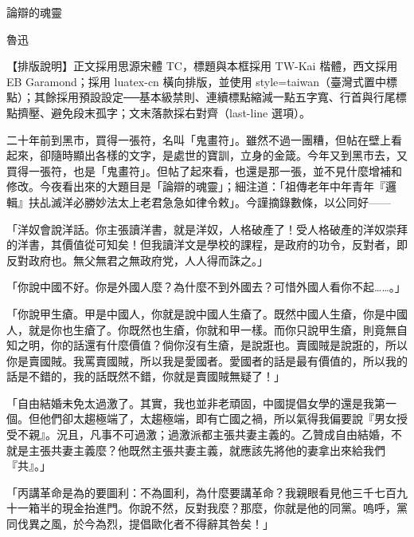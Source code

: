\documentclass[12pt]{article}
\newcommand\en[1]{{\garamond #1}}
\begin{document}
{\centering\kaiti{} 論辯的魂靈\par}
\vspace{0.3em}
{\centering\kaiti{} 魯迅\par}
\vspace{1.2em}

\noindent\setlength{\fboxsep}{0.8em}%
\colorbox{yellow!14!orange!6}{\parbox{\dimexpr\linewidth-2\fboxsep\relax}{%
  \kaiti\small\setlength{\parindent}{0pt}\color{black!75}%
  【排版說明】正文採用思源宋體 \en{TC}，標題與本框採用 \en{TW-Kai} 楷體，西文採用 \en{EB Garamond}；採用 \en{luatex-cn} 橫向排版，並使用 \en{style=taiwan}（臺灣式置中標點）；其餘採用預設設定──基本級禁則、連續標點縮減一點五字寬、行首與行尾標點擠壓、避免段末孤字；文末落款採右對齊（\en{last-line} 選項）。}}
\vspace{0.8em}

二十年前到黑市，買得一張符，名叫「鬼畫符」。雖然不過一團糟，但帖在壁上看起來，卻隨時顯出各樣的文字，是處世的寶訓，立身的金箴。今年又到黑市去，又買得一張符，也是「鬼畫符」。但帖了起來看，也還是那一張，並不見什麼增補和修改。今夜看出來的大題目是「論辯的魂靈」；細注道：「祖傳老年中年青年『邏輯』扶乩滅洋必勝妙法太上老君急急如律令敕」。今謹摘錄數條，以公同好——

「洋奴會說洋話。你主張讀洋書，就是洋奴，人格破產了！受人格破產的洋奴崇拜的洋書，其價值從可知矣！但我讀洋文是學校的課程，是政府的功令，反對者，即反對政府也。無父無君之無政府党，人人得而誅之。」

「你說中國不好。你是外國人麼？為什麼不到外國去？可惜外國人看你不起……。」

「你說甲生瘡。甲是中國人，你就是說中國人生瘡了。既然中國人生瘡，你是中國人，就是你也生瘡了。你既然也生瘡，你就和甲一樣。而你只說甲生瘡，則竟無自知之明，你的話還有什麼價值？倘你沒有生瘡，是說誑也。賣國賊是說誑的，所以你是賣國賊。我罵賣國賊，所以我是愛國者。愛國者的話是最有價值的，所以我的話是不錯的，我的話既然不錯，你就是賣國賊無疑了！」

「自由結婚未免太過激了。其實，我也並非老頑固，中國提倡女學的還是我第一個。但他們卻太趨極端了，太趨極端，即有亡國之禍，所以氣得我偏要說『男女授受不親』。況且，凡事不可過激；過激派都主張共妻主義的。乙贊成自由結婚，不就是主張共妻主義麼？他既然主張共妻主義，就應該先將他的妻拿出來給我們『共』。」

「丙講革命是為的要圖利：不為圖利，為什麼要講革命？我親眼看見他三千七百九十一箱半的現金抬進門。你說不然，反對我麼？那麼，你就是他的同黨。嗚呼，黨同伐異之風，於今為烈，提倡歐化者不得辭其咎矣！」
\end{document}
